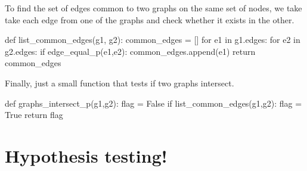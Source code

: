 To find the set of edges common to two graphs on the same set of nodes, we take take each
edge from one of the graphs and check whether it exists in the other. 


\nwenddocs{}\plusendmoddef\nwstartdeflinemarkup{}\nwenddeflinemarkup
def list_common_edges(g1, g2):
     common_edges = []
     for e1 in g1.edges:
          for e2 in g2.edges:
             if  edge_equal_p(e1,e2):
                  common_edges.append(e1)
     return common_edges
\nwendcode{}\nwdocspar

Finally, just a small function that tests if two graphs intersect. 

\nwenddocs{}\plusendmoddef\nwstartdeflinemarkup{}\nwenddeflinemarkup
def graphs_intersect_p(g1,g2):
     flag = False
     if list_common_edges(g1,g2):     
          flag = True 
     return flag
\nwendcode{}\nwdocspar

\section{Hypothesis testing!}

\nwenddocs{}\endmoddef\nwstartdeflinemarkup{}\nwenddeflinemarkup
{}\nwendcode{}\nwdocspar



\nwenddocs{}


